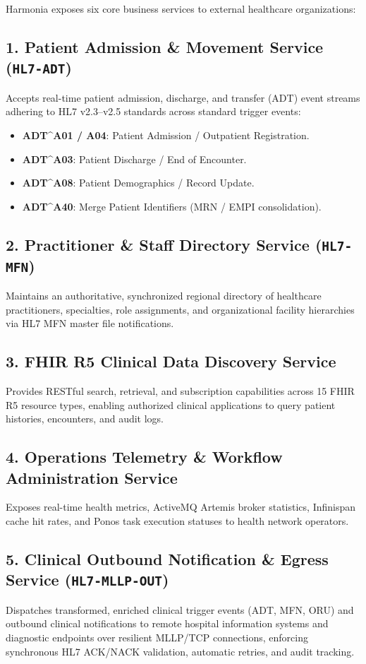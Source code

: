 Harmonia exposes six core business services to external healthcare organizations:

\subsection{1. Patient Admission \& Movement Service (\texttt{HL7-ADT})}
Accepts real-time patient admission, discharge, and transfer (ADT) event streams adhering to HL7 v2.3--v2.5 standards across standard trigger events:
\begin{itemize}
    \item \textbf{ADT\^{}A01 / A04}: Patient Admission / Outpatient Registration.
    \item \textbf{ADT\^{}A03}: Patient Discharge / End of Encounter.
    \item \textbf{ADT\^{}A08}: Patient Demographics / Record Update.
    \item \textbf{ADT\^{}A40}: Merge Patient Identifiers (MRN / EMPI consolidation).
\end{itemize}

\subsection{2. Practitioner \& Staff Directory Service (\texttt{HL7-MFN})}
Maintains an authoritative, synchronized regional directory of healthcare practitioners, specialties, role assignments, and organizational facility hierarchies via HL7 MFN master file notifications.

\subsection{3. FHIR R5 Clinical Data Discovery Service}
Provides RESTful search, retrieval, and subscription capabilities across 15 FHIR R5 resource types, enabling authorized clinical applications to query patient histories, encounters, and audit logs.

\subsection{4. Operations Telemetry \& Workflow Administration Service}
Exposes real-time health metrics, ActiveMQ Artemis broker statistics, Infinispan cache hit rates, and Ponos task execution statuses to health network operators.

\subsection{5. Clinical Outbound Notification \& Egress Service (\texttt{HL7-MLLP-OUT})}
Dispatches transformed, enriched clinical trigger events (ADT, MFN, ORU) and outbound clinical notifications to remote hospital information systems and diagnostic endpoints over resilient MLLP/TCP connections, enforcing synchronous HL7 ACK/NACK validation, automatic retries, and audit tracking.

